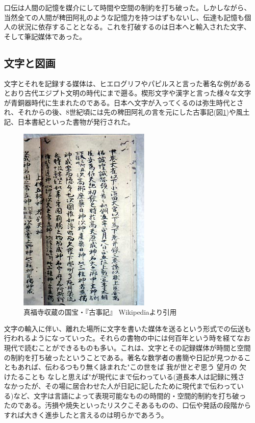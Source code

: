 口伝は人間の記憶を媒介にして時間や空間の制約を打ち破った。しかしながら、当然全ての人間が稗田阿礼のような記憶力を持つはずもないし、伝達も記憶も個人の状況に依存することとなる。これを打破するのは日本へと輸入された文字、そして筆記媒体であった。

\subsection{文字と図画}

文字とそれを記録する媒体は、ヒエログリフやパピルスと言った著名な例があるとおり古代エジプト文明の時代にまで遡る。楔形文字や漢字と言った様々な文字が青銅器時代に生まれたのである。日本へ文字が入ってくるのは弥生時代とされ、それからの後、8世紀頃には先の稗田阿礼の言を元にした古事記(図\ref{fig0_2})や風土記、日本書紀といった書物が発行された。

\begin{figure}[htbp]
\centering
\includegraphics[width=0.6\linewidth,keepaspectratio,bb=0 0 246 350]{fig/fig0_2.jpg}
\caption{真福寺収蔵の国宝・『古事記』 Wikipediaより引用}\label{fig0_2}
\end{figure}

文字の輸入に伴い、離れた場所に文字を書いた媒体を送るという形式での伝送も行われるようになっていった。それらの書物の中には何百年という時を経てなお現代で読むことができるものも多い。これは、文字とその記録媒体が時間と空間の制約を打ち破ったということである。著名な数学者の書簡や日記が見つかることもあれば、伝わるつもり無く詠まれた"この世をば 我が世とぞ思う 望月の 欠けたることも なしと思えば"が現代にまで伝わっている(道長本人は記録に残さなかったが、その場に居合わせた人が日記に記したために現代まで伝わっている)など、文字は言語によって表現可能なものの時間的・空間的制約を打ち破ったのである。汚損や焼失といったリスクこそあるものの、口伝や発話の段階からすれば大きく進歩したと言えるのは明らかであろう。


